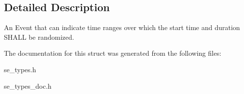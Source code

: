 \subsection{Detailed Description}
An Event that can indicate time ranges over which the start time and duration S\+H\+A\+LL be randomized. 

The documentation for this struct was generated from the following files\+:\begin{DoxyCompactItemize}
\item 
se\+\_\+types.\+h\item 
se\+\_\+types\+\_\+doc.\+h\end{DoxyCompactItemize}
